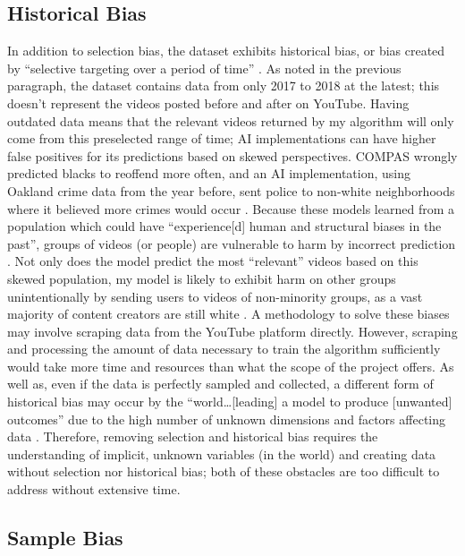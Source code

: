 \documentclass[10pt,twocolumn]{article}
\begin{document}
\subsection {Historical Bias}

In addition to selection bias, the dataset exhibits historical bias, or bias created by “selective targeting over a period of time” \cite{Fuchs2018}. As noted in the previous paragraph, the dataset contains data from only 2017 to 2018 at the latest; this doesn’t represent the videos posted before and after on YouTube. Having outdated data means that the relevant videos returned by my algorithm will only come from this preselected range of time; AI implementations can have higher false positives for its predictions based on skewed perspectives. COMPAS wrongly predicted blacks to reoffend more often, and an AI implementation, using Oakland crime data from the year before, sent police to non-white neighborhoods where it believed more crimes would occur \cite{fairness2017}. Because these models learned from a population which could have “experience[d] human and structural biases in the past”, groups of videos (or people) are vulnerable to harm by incorrect prediction \cite{Rajkomar2018}. Not only does the model predict the most “relevant” videos based on this skewed population, my model is likely to exhibit harm on other groups unintentionally by sending users to videos of non-minority groups, as a vast majority of content creators are still white \cite{Zippia2021}. A methodology to solve these biases may involve scraping data from the YouTube platform directly. However, scraping and processing the amount of data necessary to train the algorithm sufficiently would take more time and resources than what the scope of the project offers. As well as, even if the data is perfectly sampled and collected, a different form of historical bias may occur by the “world…[leading] a model to produce [unwanted] outcomes” due to the high number of unknown dimensions and factors affecting data \cite{Hellstrom2020}. Therefore, removing selection and historical bias requires the understanding of implicit, unknown variables (in the world) and creating data without selection nor historical bias; both of these obstacles are too difficult to address without extensive time.

\subsection {Sample Bias}
\end{document}
